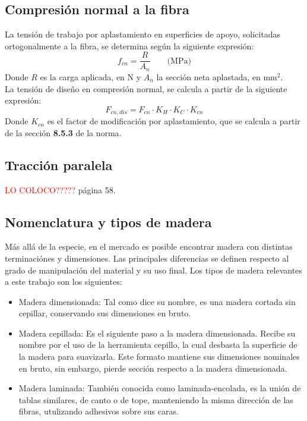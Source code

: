 \subsection{Compresión normal a la fibra}
La tensión de trabajo por aplastamiento en superficies de apoyo, solicitadas ortogonalmente a la fibra, se determina según la siguiente expresión:
\begin{equation}
	f_{cn}= \frac{R}{A_n} \qquad \text{(MPa)}
\end{equation}
Donde $R$ es la carga aplicada, en N y $A_n$ la sección neta aplastada, en mm$^2$.
\\
La tensión de diseño en compresión normal, se calcula a partir de la siguiente expresión:
\begin{equation}
	F_{cn,dis} = F_{cn} \cdot K_H \cdot K_C \cdot K_{cn}
\end{equation}
Donde $K_{cn}$ es el factor de modificación por aplastamiento, que se calcula a partir de la sección \textbf{8.5.3} de la norma.

\subsection{Tracción paralela}
\textcolor{red}{LO COLOCO?????} página 58.

\subsection{Nomenclatura y tipos de madera}
Más allá de la especie, en el mercado es posible encontrar madera con distintas terminaciónes y dimensiones. Las principales diferencias se definen respecto al grado de manipulación del material y su uso final. Los tipos de madera relevantes a este trabajo son los siguientes:
\begin{itemize}
	\item Madera dimensionada: Tal como dice su nombre, es una madera cortada sin cepillar, conservando sus dimensiones en bruto.
	\item Madera cepillada: Es el siguiente paso a la madera dimensionada. Recibe su nombre por el uso de la herramienta cepillo, la cual desbasta la superficie de la madera para suavizarla. Este formato mantiene sus dimensiones nominales en bruto, sin embargo, pierde sección respecto a la madera dimensionada.
	\item Madera laminada: También conocida como laminada-encolada, es la unión de tablas similares, de canto o de tope, manteniendo la misma dirección de las fibras, utulizando adhesivos sobre sus caras.
\end{itemize}

